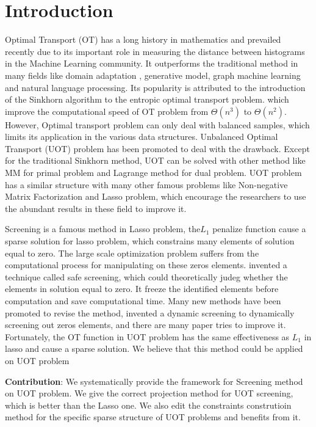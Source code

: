 \section{Introduction}
Optimal Transport (OT) has a long history in mathematics and prevailed recently due to its important role in measuring the distance between histograms in the Machine Learning community. It outperforms the traditional method in many fields like domain adaptation \cite{7586038}, generative model\cite{arjovsky2017wasserstein}, graph machine learning and natural language processing. Its popularity is attributed to the introduction of the Sinkhorn algorithm to the entropic optimal transport problem. which improve the computational speed of OT problem from $\Theta (n^3)$ to $\Theta (n^2)$. However, Optimal transport problem can only deal with balanced samples, which limits its application in the various data structures. Unbalanced Optimal Transport (UOT) problem has been promoted to deal with the drawback. Except for the traditional Sinkhorn method, UOT can be solved with other method like MM  for primal problem and Lagrange method for dual problem. UOT problem has a similar structure with many other famous problems like Non-negative Matrix Factorization and Lasso problem, which encourage the researchers to use the abundant results in these field to improve it.

Screening is a famous method in Lasso problem, the$L_1$ penalize function cause a sparse solution for lasso problem, which constrains many elements of solution equal to zero. The large scale optimization problem suffers from the computational process for manipulating on these zeros elements. \cite{} invented a technique called safe screening, which could theoretically judeg whether the elements in solution equal to zero. It freeze the identified elements before computation and save computational time. Many new methods have been promoted to revise the method, \cite{} invented a dynamic screening to dynamically screening out zeros elements, and there are many paper tries to improve it.  
Fortunately, the OT function in UOT problem has the same effectiveness as $L_1$ in lasso and cause a sparse solution. We believe that this method could be applied on UOT problem

\textbf{Contribution}: We systematically provide the framework for Screening method on UOT problem. We give the correct projection method for UOT screening, which is better than the Lasso one. We also edit the constraints construtioin method for the specific sparse structure of UOT problems and benefits from it.



